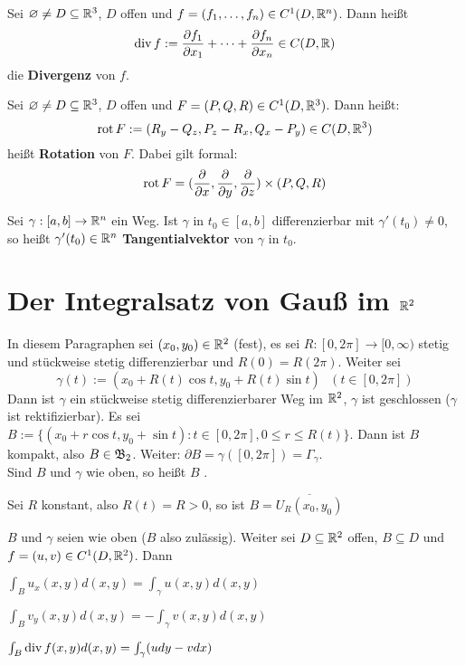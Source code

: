 \documentclass[a4paper,twoside,DIV15,BCOR12mm,chapterprefix=true,headings=onelinechapter]{scrbook}
\begin{document}
\begin{definition}
Sei $\varnothing\ne D\subseteq\mathbb{R}^3$, $D$ offen und $f=(f_1,\ldots,f_n)\in C^1(D,\mathbb{R}^n)$. Dann heißt
\[\mathop{\rm div}\nolimits f:=\frac{\partial f_1}{\partial x_1}+\cdots+\frac{\partial f_n}{\partial x_n}\in C(D,\mathbb{R})\]
die \textbf{Divergenz} von $f$.
\end{definition}

\begin{definition}
Sei $\varnothing\ne D\subseteq\mathbb{R}^3$, $D$ offen und $F=(P,Q,R)\in C^1(D,\mathbb{R}^3)$. Dann heißt:
\[\mathop{\rm rot}\nolimits F:=(R_y-Q_z,P_z-R_x,Q_x-P_y)\in C(D,\mathbb{R}^3)\]
heißt \textbf{Rotation} von $F$.
Dabei gilt formal:
\[\mathop{\rm rot}\nolimits F=(\frac{\partial}{\partial x},\frac{\partial}{\partial y},\frac{\partial}{\partial z})\times(P,Q,R)\]
\end{definition}

\begin{definition}
Sei $\gamma:[a,b]\to\mathbb{R}^n$ ein Weg. Ist $\gamma$ in $t_0\in[a,b]$ differenzierbar mit $\gamma'(t_0)\ne 0$, so heißt $\gamma'(t_0)\in\mathbb{R}^n$ \textbf{Tangentialvektor} von $\gamma$ in $t_0$.
\end{definition}

\chapter{Der Integralsatz von Gauß im $\mathbb{R}^2$}
In diesem Paragraphen sei $(x_0,y_0)\in\mathbb{R}^2$ (fest), es sei $R:[0,2\pi]\to[0,\infty)$ stetig und stückweise stetig differenzierbar und $R(0) = R(2\pi)$. Weiter sei 
\begin{displaymath}
\gamma(t) := (x_0 + R(t)\cos t,y_0 + R(t)\sin t) \text{   } (t\in[0,2\pi])
\end{displaymath}
Dann ist $\gamma$ ein stückweise stetig differenzierbarer Weg im $\mathbb{R}^2$, $\gamma$ ist geschlossen ($\gamma$ ist rektifizierbar). Es sei $B:= \{(x_0+r\cos t,y_0 + \sin t): t\in [0,2\pi ], 0\le r\le R(t)\}$. Dann ist $B$ kompakt, also $B\in\mathfrak{B}_2 $. Weiter: $\partial B = \gamma([0,2\pi]) = \Gamma_\gamma$.\\
Sind $B$ und $\gamma$ wie oben, so heißt $B$ .
\begin{beispiel}
 Sei $R$ konstant, also $R(t) = R > 0$, so ist $B = \overline{U_R(x_0,y_0)}$
\end{beispiel}

\begin{satz}
$B$ und $\gamma$ seien wie oben ($B$ also zulässig). Weiter sei $D\subseteq \mathbb{R}^2$ offen, $B\subseteq D$ und $f = (u,v) \in C^1(D,\mathbb{R}^2)$. Dann
\begin{liste}
\item $\int_B u_x(x,y)d(x,y) = \int_{\gamma} u(x,y) d(x,y)$
\item $\int_B v_y(x,y)d(x,y) = -\int_{\gamma} v(x,y) d(x,y)$
\item $\int_B \mathop{\rm div}\nolimits f(x,y)d(x,y) = \int_{\gamma} (udy - vdx)$
\end{liste}
\end{satz}
\end{document}

